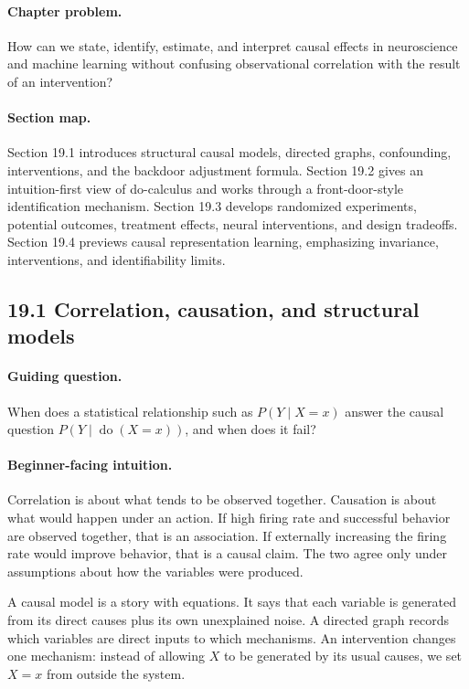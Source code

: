 \paragraph{Chapter problem.}
How can we state, identify, estimate, and interpret causal effects in neuroscience and machine learning without confusing observational correlation with the result of an intervention?

\paragraph{Section map.}
Section 19.1 introduces structural causal models, directed graphs, confounding, interventions, and the backdoor adjustment formula. Section 19.2 gives an intuition-first view of do-calculus and works through a front-door-style identification mechanism. Section 19.3 develops randomized experiments, potential outcomes, treatment effects, neural interventions, and design tradeoffs. Section 19.4 previews causal representation learning, emphasizing invariance, interventions, and identifiability limits.

\subsection{19.1 Correlation, causation, and structural models}

\paragraph{Guiding question.}
When does a statistical relationship such as \(P(Y\mid X=x)\) answer the causal question \(P(Y\mid \operatorname{do}(X=x))\), and when does it fail?

\paragraph{Beginner-facing intuition.}
Correlation is about what tends to be observed together. Causation is about what would happen under an action. If high firing rate and successful behavior are observed together, that is an association. If externally increasing the firing rate would improve behavior, that is a causal claim. The two agree only under assumptions about how the variables were produced.

A causal model is a story with equations. It says that each variable is generated from its direct causes plus its own unexplained noise. A directed graph records which variables are direct inputs to which mechanisms. An intervention changes one mechanism: instead of allowing \(X\) to be generated by its usual causes, we set \(X=x\) from outside the system.

